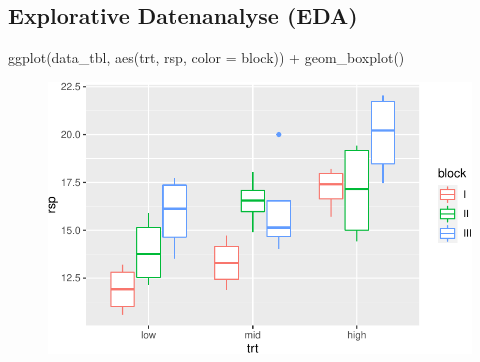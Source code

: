 \documentclass[
  letterpaper,
]{scrbook}
\newenvironment{Shaded}{\begin{snugshade}}{\end{snugshade}}
\newcommand{\AttributeTok}[1]{\textcolor[rgb]{0.40,0.45,0.13}{#1}}
\newcommand{\FunctionTok}[1]{\textcolor[rgb]{0.28,0.35,0.67}{#1}}
\newcommand{\NormalTok}[1]{\textcolor[rgb]{0.00,0.23,0.31}{#1}}
\newcommand{\SpecialCharTok}[1]{\textcolor[rgb]{0.37,0.37,0.37}{#1}}
\begin{document}
\hypertarget{explorative-datenanalyse-eda}{%
\subsection{Explorative Datenanalyse
(EDA)}\label{explorative-datenanalyse-eda}}

\begin{Shaded}
\begin{Highlighting}[]
\FunctionTok{ggplot}\NormalTok{(data\_tbl, }\FunctionTok{aes}\NormalTok{(trt, rsp, }\AttributeTok{color =}\NormalTok{ block)) }\SpecialCharTok{+}
  \FunctionTok{geom\_boxplot}\NormalTok{()}
\end{Highlighting}
\end{Shaded}

\begin{figure}[H]

{\centering \includegraphics{./app-example-analysis_files/figure-pdf/unnamed-chunk-5-1.pdf}

}

\end{figure}
\end{document}
